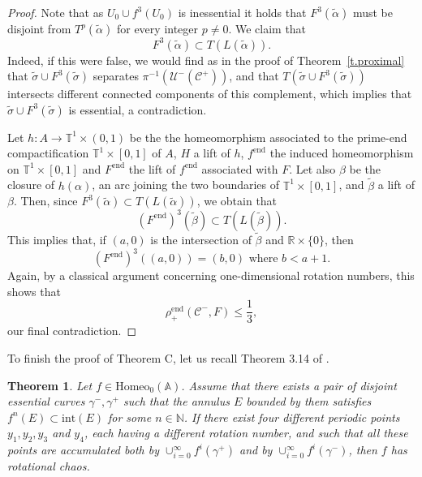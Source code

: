 \documentclass[12pt,a4paper]{amsart}
\newtheorem{thm}{Theorem}[section]
\theoremstyle{definition}
\theoremstyle{remark}
\newcommand{\T}{\mathbb{T}}
\newcommand{\R}{\mathbb{R}}
\newcommand{\A}{\mathbb{A}}
\begin{document}
\begin{proof}
Note that as $U_0\cup f^3(U_0)$ is inessential it holds that $F^3(\tilde \alpha)$ must be disjoint from $T^p(\tilde \alpha)$ for every integer $p\neq 0$. We claim that 
$$F^3(\tilde \alpha)\subset T(L(\tilde \alpha)).$$ 
Indeed, if this were false, we would find as in the proof of Theorem~\ref{t.proximal} that $\widetilde \sigma\cup F^3(\widetilde \sigma)$ separates $\pi^{-1}(\mathcal{U}^{-}(\mathcal{C}^{+}))$, and that $T\left(\widetilde \sigma\cup F^3(\widetilde \sigma)\right)$ intersects different connected components of this complement, which implies that $\widetilde \sigma\cup F^3(\widetilde \sigma)$ is essential, a contradiction.

Let $h:A\to\T^1\times(0,1)$ be the the homeomorphism associated to the prime-end compactification $\T^1\times[0,1]$ of $A$, $H$ a lift of $h$, $f^{\mathrm{end}}$ the induced homeomorphism on $\T^1\times[0,1]$ and $F^{\mathrm{end}}$ the lift of $f^{\mathrm{end}}$ associated with $F$. Let also $\beta$ be the closure of $h(\alpha)$, an arc joining the two boundaries of $\T^1\times[0,1]$, and $\widetilde {\beta}$ a lift of $\beta$. Then, since $F^3(\tilde \alpha)\subset T(L(\tilde \alpha))$, we obtain that 
$$(F^{\mathrm{end}})^3(\widetilde{\beta})\subset T(L(\widetilde \beta)).$$
 This implies that, if $(a,0)$ is the intersection of $\widetilde\beta$ and $\R\times\{0\}$, then 
 $$(F^{\mathrm{end}})^3((a,0))=(b,0)\mbox{ where }b<a+1.$$
 Again, by a classical argument concerning one-dimensional rotation numbers, this shows that  
 $$\rho^{\mathrm{end}}_+(\mathcal{C}^-,F)\le \frac{1}{3},$$ 
 our final contradiction.
\end{proof}
 
To finish the proof of Theorem C, let us recall Theorem 3.14 of \cite{paposa}.
\begin{thm}\label{thmpaposa}
Let $f\in \mathrm{Homeo}_0(\A)$. Assume that there exists a pair of disjoint essential curves $\gamma^-, \gamma^+ $ such that the annulus \( E \) bounded by them satisfies \( f^n(E) \subset \mathrm{int}(E) \) for some \( n \in \mathbb{N} \).  If there exist four different periodic points $y_1, y_2, y_3$ and $y_4$, each having a different rotation number, and such that all these points are accumulated both by $\cup_{i=0}^{\infty}f^i(\gamma^{+})$ and by $\cup_{i=0}^{\infty}f^i(\gamma^{-})$, then $f$ has rotational chaos.
\end{thm}
\end{document}
